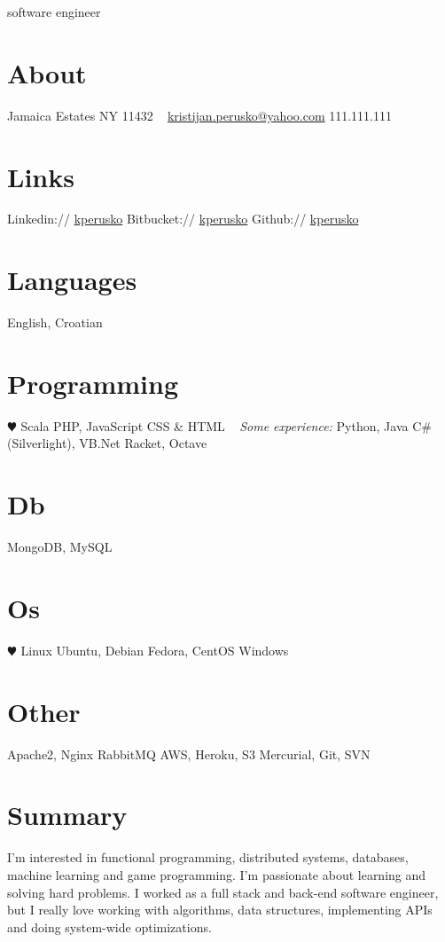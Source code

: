 \documentclass[]{cv}
\begin{document}
       {software engineer}


\begin{aside}
  \section{About}
    Jamaica Estates
    NY 11432
~
    \href{mailto:kristijan.perusko@yahoo.com}{kristijan.perusko@yahoo.com}
    111.111.111
  \section{Links}  
    Linkedin://  \href{https://www.linkedin.com/in/kperusko}{kperusko}
    Bitbucket:// \href{https://bitbucket.org/kperusko}{kperusko}    
    Github:// \href{https://github.com/kperusko}{kperusko}
  \section{Languages}
    English, Croatian
  \section{Programming}
    {\color{red} $\varheartsuit$} Scala
    PHP, JavaScript
    CSS \& HTML
~     
    \emph{Some experience:}
    Python, Java
    C\# (Silverlight), VB.Net
    Racket, Octave
  \section{Db}
    MongoDB, MySQL
  \section{Os}
    {\color{red} $\varheartsuit$} Linux 
    Ubuntu, Debian 
    Fedora, CentOS
    Windows
  \section{Other}
    Apache2, Nginx
    RabbitMQ
    AWS, Heroku, S3
    Mercurial, Git, SVN
\end{aside}

\section{Summary}

I’m interested in functional programming, distributed systems, databases, machine learning and game programming. I'm passionate about learning and solving hard problems. I worked as a full stack and back-end software engineer, but I really love working with algorithms, data structures, implementing APIs and doing system-wide optimizations.
\end{document}
